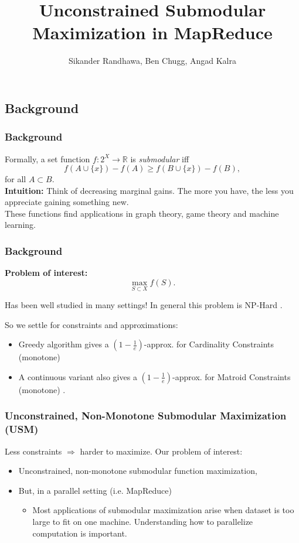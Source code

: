 \documentclass{beamer}
\title{Unconstrained Submodular Maximization in MapReduce}
\author{Sikander Randhawa, Ben Chugg, Angad Kalra}
\institute{\textsc{The university of British Columbia \\ Vancouver, Canada}}
\date{}
\newcommand{\R}{\mathbb{R}}
\begin{document}
\begin{frame}
\titlepage
\end{frame}

\begin{frame}
\section{Background}
\frametitle{Background}
Formally, a set function $f:2^X\rightarrow \R$ is \textit{submodular} iff 
\[f(A\cup \{x\})-f(A) \geq f(B\cup\{x\})-f(B),\]
for all $A\subset B$. \\
\vspace{0.4cm}
\textbf{Intuition:} Think of decreasing marginal gains. The more you have, the less you appreciate gaining something new. \\
\vspace{0.4cm}
These functions find applications in graph theory, game theory and machine learning. 
\end{frame}

\begin{frame}
\frametitle{Background}
\textbf{Problem of interest:}
\[\max_{S\subset X}f(S).\]

Has been well studied in many settings! In general this problem is NP-Hard \cite{Feige}.

\vspace{0.4cm}
So we settle for constraints and approximations:
\begin{itemize}
\item Greedy algorithm gives a $(1- \frac{1}{e})$-approx. for Cardinality Constraints (monotone) \cite{Buchbinder}
\item A continuous variant also gives a $(1 - \frac{1}{e})$-approx. for Matroid Constraints (monotone) \cite{Calinescu2007}. 
\end{itemize}
\end{frame}

\begin{frame}
\frametitle{Unconstrained, Non-Monotone Submodular Maximization (USM)}
Less constraints $\Rightarrow$ harder to maximize. Our problem of interest:
\begin{itemize}
\item Unconstrained, non-monotone submodular function maximization,
\item But, in a parallel setting (i.e. MapReduce) 
\begin{itemize}
\item Most applications of submodular maximization arise when dataset is too large to fit on one machine. Understanding how to parallelize computation is important. 
\end{itemize}
\end{itemize}
\end{frame}
\end{document}
